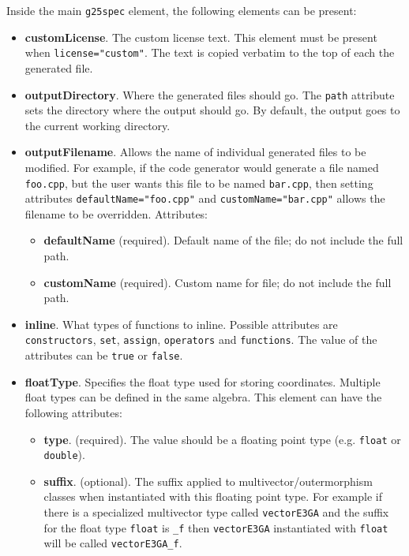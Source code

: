 \documentclass[10pt, a4paper]{article}
\begin{document}
  
Inside the main {\tt g25spec} element, the following elements can be present:
\begin{itemize}
\item {\bf customLicense}. The custom license text. This element must be present when {\tt license="custom"}. 
         The text is copied verbatim to the top of each the generated file.
         
\item {\bf outputDirectory}. Where the generated files should go. The {\tt path} attribute sets the directory
	where the output should go. By default, the output goes to the current working directory.
       
\item {\bf outputFilename}. Allows the name of individual generated files to be modified. For example, if the code generator 
       would generate a file named {\tt foo.cpp}, but the user wants this file to be named {\tt bar.cpp}, then setting 
       attributes {\tt defaultName="foo.cpp"} and {\tt customName="bar.cpp"}
       allows the filename to be overridden. Attributes:
       \begin{itemize}
       \item {\bf defaultName} (required). Default name of the file; do not include the full path.
       \item {\bf customName} (required). Custom name for file; do not include the full path.
       \end{itemize}
         
\item {\bf inline}. What types of functions to inline. Possible attributes are {\tt constructors}, 
      {\tt set}, {\tt assign}, {\tt operators} and {\tt functions}.
      The value of the attributes can be {\tt true} or {\tt false}.
      
\item {\bf floatType}. Specifies the float type used for storing coordinates.
	Multiple float types can be defined in the same algebra. This element can have the following attributes:
       \begin{itemize}
       \item {\bf type}. (required). The value should be a floating point type (e.g. {\tt float} or {\tt double}).
       
       \item {\bf suffix}. (optional). The suffix applied to multivector/outermorphism classes when instantiated with this
            floating point type. For example if there is a specialized multivector type called {\tt vectorE3GA} and the suffix
            for the float type {\tt float} is {\tt \_f} then {\tt vectorE3GA} instantiated with {\tt float}
            will be called {\tt vectorE3GA\_f}.
            

\end{itemize}
\end{itemize}
\end{document}

